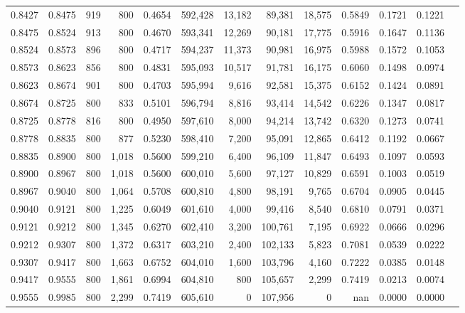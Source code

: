 \begin{tabular}{rrrrrrrrrrrrr}
0.8427 & 0.8475 &    919 &   800 &                                     0.4654 & 592,428 &  13,182 &  89,381 &  18,575 & 0.5849 & 0.1721 & 0.1221 \\
0.8475 & 0.8524 &    913 &   800 &                                     0.4670 & 593,341 &  12,269 &  90,181 &  17,775 & 0.5916 & 0.1647 & 0.1136 \\
0.8524 & 0.8573 &    896 &   800 &                                     0.4717 & 594,237 &  11,373 &  90,981 &  16,975 & 0.5988 & 0.1572 & 0.1053 \\
0.8573 & 0.8623 &    856 &   800 &                                     0.4831 & 595,093 &  10,517 &  91,781 &  16,175 & 0.6060 & 0.1498 & 0.0974 \\
0.8623 & 0.8674 &    901 &   800 &                                     0.4703 & 595,994 &   9,616 &  92,581 &  15,375 & 0.6152 & 0.1424 & 0.0891 \\
0.8674 & 0.8725 &    800 &   833 &                                     0.5101 & 596,794 &   8,816 &  93,414 &  14,542 & 0.6226 & 0.1347 & 0.0817 \\
0.8725 & 0.8778 &    816 &   800 &                                     0.4950 & 597,610 &   8,000 &  94,214 &  13,742 & 0.6320 & 0.1273 & 0.0741 \\
0.8778 & 0.8835 &    800 &   877 &                                     0.5230 & 598,410 &   7,200 &  95,091 &  12,865 & 0.6412 & 0.1192 & 0.0667 \\
0.8835 & 0.8900 &    800 & 1,018 &                                     0.5600 & 599,210 &   6,400 &  96,109 &  11,847 & 0.6493 & 0.1097 & 0.0593 \\
0.8900 & 0.8967 &    800 & 1,018 &                                     0.5600 & 600,010 &   5,600 &  97,127 &  10,829 & 0.6591 & 0.1003 & 0.0519 \\
0.8967 & 0.9040 &    800 & 1,064 &                                     0.5708 & 600,810 &   4,800 &  98,191 &   9,765 & 0.6704 & 0.0905 & 0.0445 \\
0.9040 & 0.9121 &    800 & 1,225 &                                     0.6049 & 601,610 &   4,000 &  99,416 &   8,540 & 0.6810 & 0.0791 & 0.0371 \\
0.9121 & 0.9212 &    800 & 1,345 &                                     0.6270 & 602,410 &   3,200 & 100,761 &   7,195 & 0.6922 & 0.0666 & 0.0296 \\
0.9212 & 0.9307 &    800 & 1,372 &                                     0.6317 & 603,210 &   2,400 & 102,133 &   5,823 & 0.7081 & 0.0539 & 0.0222 \\
0.9307 & 0.9417 &    800 & 1,663 &                                     0.6752 & 604,010 &   1,600 & 103,796 &   4,160 & 0.7222 & 0.0385 & 0.0148 \\
0.9417 & 0.9555 &    800 & 1,861 &                                     0.6994 & 604,810 &     800 & 105,657 &   2,299 & 0.7419 & 0.0213 & 0.0074 \\
0.9555 & 0.9985 &    800 & 2,299 &                                     0.7419 & 605,610 &       0 & 107,956 &       0 &    nan & 0.0000 & 0.0000 \\
\bottomrule
\end{tabular}
